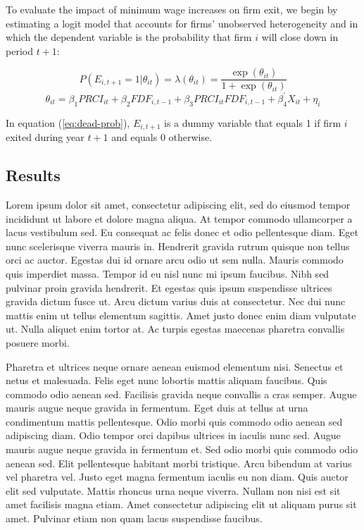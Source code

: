\documentclass[12pt]{article}
\begin{document}
To evaluate the impact of minimum wage increases on firm exit, we begin by estimating a logit model that accounts for firms' unobserved heterogeneity and in which the dependent variable is the probability that firm $i$ will close down in period $t+1$: 

\begin{equation}\label{eq:dead-prob}
 P(E_{i, t+1}=1|\theta_{i t}) = \lambda(\theta_{i t}) = \frac{\exp{(\theta_{i 
t})}}{1+\exp{(\theta_{i t})}} 
\end{equation}
\begin{equation}\label{eq:dead-formula}
 \theta_{i t} = \beta_1 PRCI_{i t} + \beta_2 FDF_{i,t-1} + \beta_3 PRCI_{i t} FDF_{i,t-1} + 
\beta_4^\prime X_{i t} + \eta_i 
\end{equation}

In equation (\ref{eq:dead-prob}), $E_{i, t+1}$ is a dummy variable that equals 1 if firm $i$ exited during year $t+1$ and equals 0 otherwise. 





\subsection{Results}

Lorem ipsum dolor sit amet, consectetur adipiscing elit, sed do eiusmod tempor incididunt ut labore et dolore magna aliqua. At tempor commodo ullamcorper a lacus vestibulum sed. Eu consequat ac felis donec et odio pellentesque diam. Eget nunc scelerisque viverra mauris in. Hendrerit gravida rutrum quisque non tellus orci ac auctor. Egestas dui id ornare arcu odio ut sem nulla. Mauris commodo quis imperdiet massa. Tempor id eu nisl nunc mi ipsum faucibus. Nibh sed pulvinar proin gravida hendrerit. Et egestas quis ipsum suspendisse ultrices gravida dictum fusce ut. Arcu dictum varius duis at consectetur. Nec dui nunc mattis enim ut tellus elementum sagittis. Amet justo donec enim diam vulputate ut. Nulla aliquet enim tortor at. Ac turpis egestas maecenas pharetra convallis posuere morbi.

Pharetra et ultrices neque ornare aenean euismod elementum nisi. Senectus et netus et malesuada. Felis eget nunc lobortis mattis aliquam faucibus. Quis commodo odio aenean sed. Facilisis gravida neque convallis a cras semper. Augue mauris augue neque gravida in fermentum. Eget duis at tellus at urna condimentum mattis pellentesque. Odio morbi quis commodo odio aenean sed adipiscing diam. Odio tempor orci dapibus ultrices in iaculis nunc sed. Augue mauris augue neque gravida in fermentum et. Sed odio morbi quis commodo odio aenean sed. Elit pellentesque habitant morbi tristique. Arcu bibendum at varius vel pharetra vel. Justo eget magna fermentum iaculis eu non diam. Quis auctor elit sed vulputate. Mattis rhoncus urna neque viverra. Nullam non nisi est sit amet facilisis magna etiam. Amet consectetur adipiscing elit ut aliquam purus sit amet. Pulvinar etiam non quam lacus suspendisse faucibus.
\end{document}

